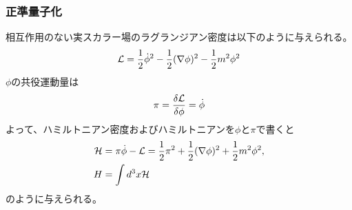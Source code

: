\documentclass[10pt,a4paper]{jarticle}
\begin{document}
\subsubsection{正準量子化}
相互作用のない実スカラー場のラグランジアン密度は以下のように与えられる。
\begin{align}
{\cal L} = \frac{1}{2} \dot\phi^2 - \frac{1}{2} (\nabla \phi)^2 - \frac{1}{2}m^2 \phi^2
\end{align}
%
$\phi$の共役運動量は
\begin{align}
\pi = \frac{\delta {\cal L}}{\delta \phi} = \dot\phi
\end{align}
よって、ハミルトニアン密度およびハミルトニアンを$\phi$と$\pi$で書くと
\begin{align}
{\cal H} &= \pi \dot\phi - {\cal L} = \frac{1}{2}\pi^2 + \frac{1}{2}(\nabla\phi)^2 + \frac{1}{2}m^2 \phi^2, \\
H &= \int d^3x {\cal H}
\end{align}
のように与えられる。
\end{document}
